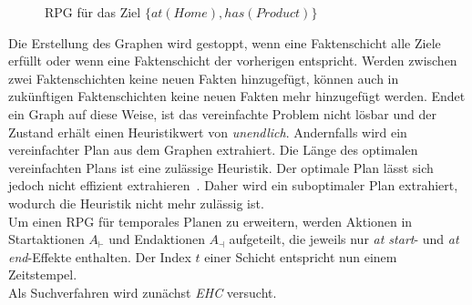 \begin{figure}[ht!]
    \caption{\acl{RPG} für das Ziel $\{at(Home), has(Product)\}$}
    \label{fig:rpg}
\end{figure}
Die Erstellung des Graphen wird gestoppt, wenn eine Faktenschicht alle Ziele erfüllt oder wenn eine Faktenschicht der vorherigen entspricht.
Werden zwischen zwei Faktenschichten keine neuen Fakten hinzugefügt, können auch in zukünftigen Faktenschichten keine neuen Fakten mehr hinzugefügt werden.
Endet ein Graph auf diese Weise, ist das vereinfachte Problem nicht lösbar und der Zustand erhält einen Heuristikwert von \emph{unendlich}.
Andernfalls wird ein vereinfachter Plan aus dem Graphen extrahiert.
Die Länge des optimalen vereinfachten Plans ist eine zulässige Heuristik.
Der optimale Plan lässt sich jedoch nicht effizient extrahieren~\cite{hoffmannnebel2001}.
Daher wird ein suboptimaler Plan extrahiert, wodurch die Heuristik nicht mehr zulässig ist.\\
Um einen \ac{RPG} für temporales Planen zu erweitern, werden Aktionen in Startaktionen $A_\vdash$ und Endaktionen $A_\dashv$ aufgeteilt, die jeweils nur \emph{at start}- und \emph{at end}-Effekte enthalten.
Der Index $t$ einer Schicht entspricht nun einem Zeitstempel.\\
Als Suchverfahren wird zunächst \emph{\ac{EHC}} versucht.
